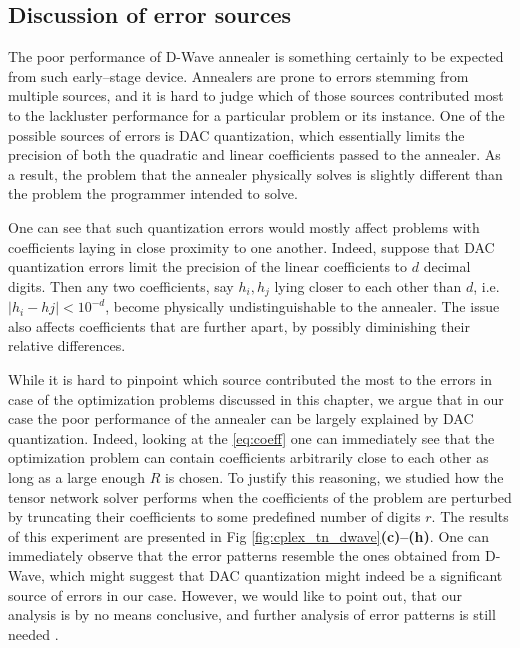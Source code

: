 \subsection{Discussion of error sources}

The poor performance of D-Wave annealer is something certainly to be expected
from such early--stage device. Annealers are prone to errors stemming from
multiple sources, and it is hard to judge which of those sources contributed
most to the lackluster performance for a particular problem or its instance.
One of the possible sources of errors is DAC quantization, which essentially
limits the precision of both the quadratic and linear coefficients passed
to the annealer. As a result, the problem that the annealer physically
solves is slightly different than the problem the programmer intended to
solve.

One can see that such quantization errors would mostly affect problems with
coefficients laying in close proximity to one another. Indeed, suppose that DAC
quantization errors limit the precision of the linear coefficients to $d$
decimal digits. Then any two coefficients, say $h_{i}, h_{{j}}$ lying closer to
each other than $d$, i.e. $|h_{i} - h {j}| < 10^{-d}$, become physically
undistinguishable to the annealer. The issue also affects coefficients that are
further apart, by possibly diminishing their relative differences.

While it is hard to pinpoint which source contributed the most to the errors in
case of the optimization problems discussed in this chapter, we argue that in
our case the poor performance of the annealer can be largely explained by DAC
quantization. Indeed, looking at the \eqref{eq:coeff} one can immediately see
that the optimization problem can contain coefficients arbitrarily close to each
other as long as a large enough $R$ is chosen. To justify this reasoning, we
studied how the tensor network solver performs when the coefficients of the
problem are perturbed by truncating their coefficients to some predefined number
of digits $r$. The results of this experiment are presented in Fig
\ref{fig:cplex_tn_dwave}\textbf{(c)--(h)}. One can immediately observe that the
error patterns resemble the ones obtained from D-Wave, which might suggest
that DAC quantization might indeed be a significant source of errors in our case.
However, we would like to point out, that our analysis is by no means
conclusive, and further analysis of error patterns is still needed
.

